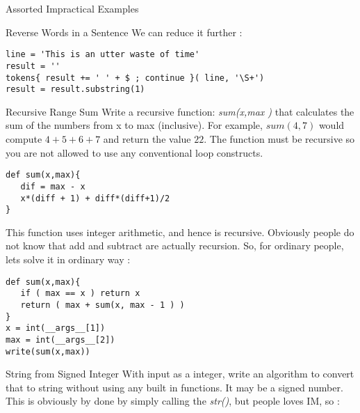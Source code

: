 \begin{section}{Assorted Impractical Examples}
\begin{subsection}{Reverse Words in a Sentence}
We can reduce it further :

\begin{center}\begin{minipage}{\linewidth}
\begin{lstlisting}[style=JexlStyle]
line = 'This is an utter waste of time'
result = ''
tokens{ result += ' ' + $ ; continue }( line, '\S+')
result = result.substring(1)
\end{lstlisting}  
\end{minipage}\end{center}

\end{subsection}

\begin{subsection}{Recursive Range Sum}
Write a recursive function: \emph{ sum(x,max ) } 
that calculates the sum of the numbers from x to max (inclusive). 
For example, $sum(4,7)$ would compute $4 + 5 + 6 + 7$ and return the value $22$. 
The function must be recursive so you are not allowed to use any conventional loop constructs.

\begin{center}\begin{minipage}{\linewidth}
\begin{lstlisting}[style=JexlStyle]
def sum(x,max){
   dif = max - x
   x*(diff + 1) + diff*(diff+1)/2  
}
\end{lstlisting}  
\end{minipage}\end{center}
This function uses integer arithmetic, and hence is recursive.
Obviously people do not know that add and subtract are actually recursion.
So, for ordinary people, lets solve it in ordinary way :

\begin{center}\begin{minipage}{\linewidth}
\begin{lstlisting}[style=JexlStyle]
def sum(x,max){
   if ( max == x ) return x
   return ( max + sum(x, max - 1 ) )
}
x = int(__args__[1])
max = int(__args__[2])
write(sum(x,max))
\end{lstlisting}  
\end{minipage}\end{center}

\end{subsection}

\begin{subsection}{String from Signed Integer}
With input as a integer, write an algorithm to convert that to string 
without using any built in functions. It may be a signed number. 
This is obviously by done by simply calling the \emph{str()}, 
but people loves IM, so :


\end{subsection}
\end{section}
